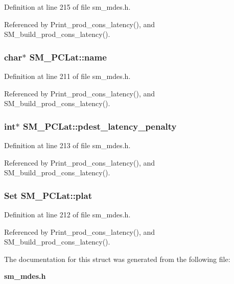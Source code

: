 Definition at line 215 of file sm\_\-mdes.h.

Referenced by Print\_\-prod\_\-cons\_\-latency(), and SM\_\-build\_\-prod\_\-cons\_\-latency().
\subsubsection{\setlength{\rightskip}{0pt plus 5cm}char$\ast$ \bf{SM\_\-PCLat::name}}\label{structSM__PCLat_297c14591b529d2f4847a54769e728d4}




Definition at line 211 of file sm\_\-mdes.h.

Referenced by Print\_\-prod\_\-cons\_\-latency(), and SM\_\-build\_\-prod\_\-cons\_\-latency().
\subsubsection{\setlength{\rightskip}{0pt plus 5cm}int$\ast$ \bf{SM\_\-PCLat::pdest\_\-latency\_\-penalty}}\label{structSM__PCLat_6a335a4b03935829aff702567d4c22ca}




Definition at line 213 of file sm\_\-mdes.h.

Referenced by Print\_\-prod\_\-cons\_\-latency(), and SM\_\-build\_\-prod\_\-cons\_\-latency().
\subsubsection{\setlength{\rightskip}{0pt plus 5cm}\bf{Set} \bf{SM\_\-PCLat::plat}}\label{structSM__PCLat_ab5660f3eca812cefd5f40a53b9ff32c}




Definition at line 212 of file sm\_\-mdes.h.

Referenced by Print\_\-prod\_\-cons\_\-latency(), and SM\_\-build\_\-prod\_\-cons\_\-latency().

The documentation for this struct was generated from the following file:\begin{CompactItemize}
\item 
\bf{sm\_\-mdes.h}\end{CompactItemize}
